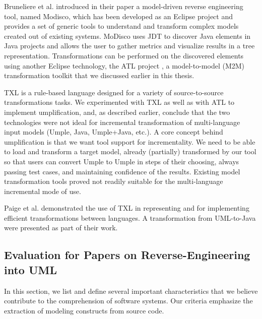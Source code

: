 Bruneliere et al.\cite{ModiscoMain} introduced in their paper a model-driven reverse engineering tool, named Modisco, which has been developed as an Eclipse project and provides a set of generic tools to understand and transform complex models created out of existing systems. MoDisco uses JDT \cite{jdtProject} to discover Java elements in Java projects and allows the user to gather metrics and visualize results in a tree representation. Transformations can be performed on the discovered elements using another Eclipse technology, the ATL project \cite{jdtProject}, a model-to-model (M2M) transformation toolkit that we discussed earlier in this thesis.

TXL \cite{Cordy2006} is a rule-based language designed for a variety of source-to-source transformations tasks. We experimented with TXL as well as with ATL to implement  umplification, and, as described earlier, conclude that the two technologies were not ideal for incremental transformation of multi-language input models (Umple, Java, Umple+Java, etc.). A core concept behind umplification is that we want tool support for incrementality. We need to be able to load and transform a target model, already (partially) transformed by our tool so that users can convert Umple to Umple in steps of their choosing, always passing test cases, and maintaining confidence of the results. Existing model transformation tools proved not readily suitable for the multi-language incremental mode of use.

Paige et al. \cite{paigetowards} demonstrated the use of TXL in representing and for implementing efficient transformations between languages. A transformation from UML-to-Java were presented as part of their work. 

\subsection{Evaluation for Papers on Reverse-Engineering into UML}

 In this section, we list and define several important characteristics that we believe contribute to the comprehension of software systems. Our criteria emphasize the extraction of modeling constructs from source code.

